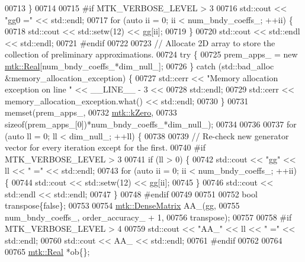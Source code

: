 \begin{DoxyCode}
{{00713   \}
00714 
00715 \textcolor{preprocessor}{  #if MTK\_VERBOSE\_LEVEL > 3}
00716   std::cout << \textcolor{stringliteral}{"gg0 ="} << std::endl;
00717   \textcolor{keywordflow}{for} (\textcolor{keyword}{auto} ii = 0; ii < num\_bndy\_coeffs\_; ++ii) \{
00718     std::cout << std::setw(12) << gg[ii];
00719   \}
00720   std::cout << std::endl << std::endl;
00721 \textcolor{preprocessor}{  #endif}
00722 
00723   \textcolor{comment}{// Allocate 2D array to store the collection of preliminary approximations.}
00724   \textcolor{keywordflow}{try} \{
00725     prem\_apps\_ = \textcolor{keyword}{new} \hyperlink{group__c01-roots_gac080bbbf5cbb5502c9f00405f894857d}{mtk::Real}[num\_bndy\_coeffs\_*dim\_null\_];
00726   \} \textcolor{keywordflow}{catch} (std::bad\_alloc &memory\_allocation\_exception) \{
00727     std::cerr << \textcolor{stringliteral}{"Memory allocation exception on line "} << \_\_LINE\_\_ - 3 <<
00728       std::endl;
00729     std::cerr << memory\_allocation\_exception.what() << std::endl;
00730   \}
00731   memset(prem\_apps\_,
00732          \hyperlink{group__c01-roots_ga59a451a5fae30d59649bcda274fea271}{mtk::kZero},
00733          \textcolor{keyword}{sizeof}(prem\_apps\_[0])*num\_bndy\_coeffs\_*dim\_null\_);
00734 
00736 
00737   \textcolor{keywordflow}{for} (\textcolor{keyword}{auto} ll = 0; ll < dim\_null\_; ++ll) \{
00738 
00739     \textcolor{comment}{// Re-check new generator vector for every iteration except for the first.}
00740 \textcolor{preprocessor}{    #if MTK\_VERBOSE\_LEVEL > 3}
00741     \textcolor{keywordflow}{if} (ll > 0) \{
00742       std::cout << \textcolor{stringliteral}{"gg"} << ll << \textcolor{stringliteral}{" ="} << std::endl;
00743       \textcolor{keywordflow}{for} (\textcolor{keyword}{auto} ii = 0; ii < num\_bndy\_coeffs\_; ++ii) \{
00744         std::cout << std::setw(12) << gg[ii];
00745       \}
00746       std::cout << std::endl << std::endl;
00747     \}
00748 \textcolor{preprocessor}{    #endif}
00749 
00751 
00752     \textcolor{keywordtype}{bool} transpose\{\textcolor{keyword}{false}\};
00753 
00754     \hyperlink{classmtk_1_1DenseMatrix}{mtk::DenseMatrix} AA\_(gg,
00755                          num\_bndy\_coeffs\_, order\_accuracy\_ + 1,
00756                          transpose);
00757 
00758 \textcolor{preprocessor}{    #if MTK\_VERBOSE\_LEVEL > 4}
00759     std::cout << \textcolor{stringliteral}{"AA\_"} << ll << \textcolor{stringliteral}{" ="} << std::endl;
00760     std::cout << AA\_ << std::endl;
00761 \textcolor{preprocessor}{    #endif}
00762 
00764 
00765     \hyperlink{group__c01-roots_gac080bbbf5cbb5502c9f00405f894857d}{mtk::Real} *ob\{\};
}}
\end{DoxyCode}
